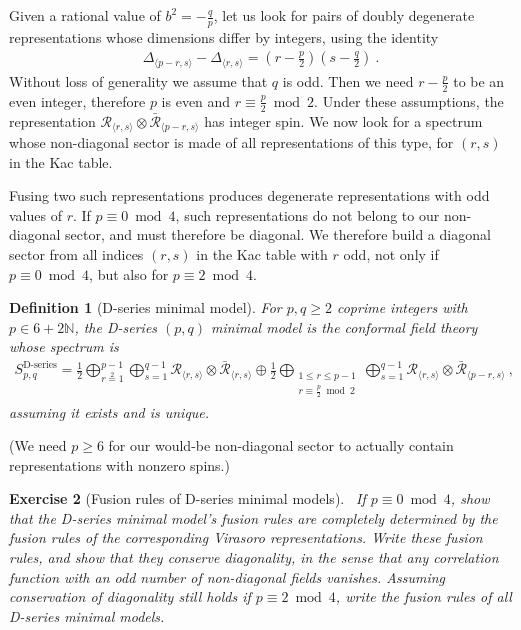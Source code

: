 \documentclass[12pt, a4paper]{article}
\theoremstyle{break}
\newtheorem{exo}{Exercise}[section]
\newtheorem{defn}[exo]{Definition}
\begin{document}
Given a rational value of $b^2=-\frac{q}{p}$, let us look for pairs of doubly degenerate representations whose dimensions differ by integers, using the identity
\begin{align}
 \Delta_{\langle p-r,s\rangle} -\Delta_{\langle r,s\rangle}= \left(r-\frac{p}{2}\right)\left(s-\frac{q}{2}\right)\ .
\end{align}
Without loss of generality we assume that $q$ is odd. Then we need $r-\frac{p}{2}$ to be an even integer, therefore $p$ is even and $r\equiv\frac{p}{2}\bmod 2$. Under these assumptions, the representation $\mathcal{R}_{\langle r,s\rangle}\otimes \bar{\mathcal{R}}_{\langle p-r,s\rangle}$ has integer spin. We now look for a spectrum whose non-diagonal sector is made of all representations of this type, for $(r,s)$ in the Kac table.

Fusing two such representations produces degenerate representations with odd values of $r$. If $p\equiv 0\bmod 4$, such representations do not belong to our non-diagonal sector, and must therefore be diagonal. We therefore build a diagonal sector from all indices $(r,s)$ in the Kac table with $r$ odd, not only if $p\equiv 0\bmod 4$, but also for $p\equiv 2\bmod 4$. 

\begin{defn}[D-series minimal model]
 For $p,q\geq 2$ coprime integers with $p\in 6+2\mathbb{N}$, the D-series $(p,q)$ minimal model is the conformal field theory whose spectrum is 
\begin{align}
 S_{p,q}^\text{D-series} = \frac12 \bigoplus_{r\overset{2}{=}1}^{p-1} \bigoplus_{s=1}^{q-1} \mathcal{R}_{ \langle r,s \rangle} \otimes \bar{\mathcal{R}}_{\langle r,s \rangle}\oplus \frac12\bigoplus_{\substack{1\leq r\leq p-1 \\ r\equiv \frac{p}{2}\bmod 2}} \bigoplus_{s=1}^{q-1} \mathcal{R}_{\langle r,s \rangle} \otimes \bar{\mathcal{R}}_{\langle p-r,s\rangle}\ ,
 \label{eq:sds}
\end{align}
assuming it exists and is unique.
\end{defn}
(We need $p\geq 6$ for our would-be non-diagonal sector to actually contain representations with nonzero spins.)

\begin{tcolorbox}
\begin{exo}[Fusion rules of D-series minimal models]
~\label{exo:frd}
 If $p\equiv 0\bmod 4$, show that the D-series minimal model's fusion rules are completely determined by the fusion rules of the corresponding Virasoro representations. Write these fusion rules, and show that they conserve diagonality, in the sense that any correlation function with an odd number of non-diagonal fields vanishes. Assuming conservation of diagonality still holds if $p\equiv 2\bmod 4$, write the fusion rules of all D-series minimal models.
\end{exo}
\end{tcolorbox}
\end{document}
